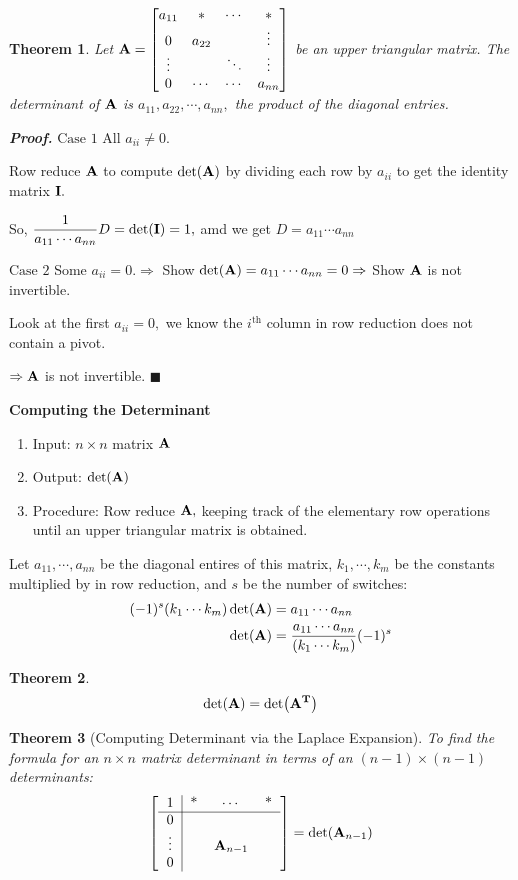 \documentclass[12pt, a4paper]{article}
\newtheorem{thm}{Theorem}[subsection]
\newenvironment*{prf}{\par\indent\textbf{\textit{Proof. }}}{\hfill $\blacksquare$\par}
\def\T{{\vb{T}}}
\def\matrixA{\vb{A}}
\def\matrixI{\vb{I}}
\begin{document}
\begin{thm}
	Let $\matrixA=\mqty[{a_{11}&*&\cdots&*\\0&a_{22}&&\vdots\\\vdots&&\ddots&\vdots\\0&\cdots&\cdots&a_{nn}}]$ be an upper triangular matrix. The determinant of $\matrixA$ is $a_{11}, a_{22},\cdots,a_{nn},$ the product of the diagonal entries. 
\end{thm}
\begin{prf}
	$\boxed{\text{Case }1}$ All $a_{ii}\neq0.$\par Row reduce $\matrixA$ to compute $\det(\matrixA)$ by dividing each row by $a_{ii}$ to get the identity matrix $\matrixI.$\par So, $\dfrac{1}{a_{11}\cdots a_{nn}}D=\det(\matrixI)=1,$ amd we get $D=a_{11}\cdots a_{nn}$\par 
	$\boxed{\text{Case }2}$ Some $a_{ii}=0.\Rightarrow$ Show $\det(\matrixA)=a_{11}\cdots a_{nn}=0\Rightarrow$ Show $\matrixA$ is not invertible.\par Look at the first $a_{ii}=0,$ we know the $i^\text{th}$ column in row reduction does not contain a pivot.\par $\Rightarrow\matrixA$ is not invertible. 
 \end{prf}
\begin{framed}
\textbf{Computing the Determinant}
\begin{enumerate}
	\item Input: $n\times n$ matrix $\matrixA$
	\item Output: $\det(\matrixA)$
	\item Procedure: Row reduce $\matrixA,$ keeping track of the elementary row operations until an upper triangular matrix is obtained. 
\end{enumerate}	
	Let $a_{11},\cdots,a_{nn}$ be the diagonal entires of this matrix, $k_1,\cdots,k_m$ be the constants multiplied by in row reduction, and $s$ be the number of switches: \[\begin{aligned}(-1)^s(k_1\cdots k_m)\det(\matrixA)&=a_{11}\cdots a_{nn}\\\det(\matrixA)&=\dfrac{a_{11}\cdots a_{nn}}{(k_1\cdots k_m)}(-1)^s\end{aligned}\]
\end{framed}
\begin{thm}
	\[\det(\matrixA)=\det(\matrixA^\T)\]	
\end{thm}
\begin{thm}[Computing Determinant via the Laplace Expansion] 
	To find the formula for an $n\times n$ matrix determinant in terms of an $(n-1)\times(n-1)$ determinants: 
	\[\left[\begin{tabular}{c|ccc}
		1&*&$\cdots$&*\\
		\hline
		0&&&\\
		$\vdots$&&$\matrixA_{n-1}$&\\
		0&&&
	\end{tabular}\right]=\det(\matrixA_{n-1})\]
\end{thm}
\end{document}
